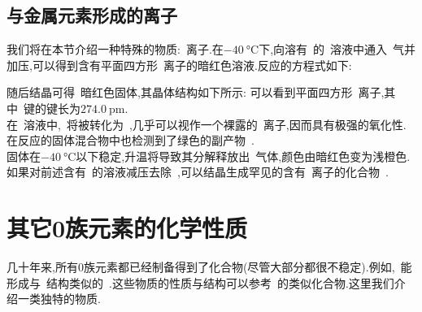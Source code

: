 \documentclass{ctexbook}
\begin{document}
\subsection{与金属元素形成的离子}
我们将在本节介绍一种特殊的物质:~离子\cite{Seidel2000}.在$\SI{-40}{\celsius}$下,向溶有~的~溶液中通入~气并加压,可以得到含有平面四方形~离子的暗红色溶液.反应的方程式如下:
\begin{tightcenter}
\end{tightcenter}
随后结晶可得~暗红色固体,其晶体结构如下所示:
可以看到平面四方形~离子,其中~键的键长为$\SI{274.0}{\pico\meter}$.\\
\indent 在~溶液中,~将被转化为~,几乎可以视作一个裸露的~离子,因而具有极强的氧化性.在反应的固体混合物中也检测到了绿色的副产物~\ce{[Xe2][Sb4F21]}.\\
\indent {}固体在$\SI{-40}{\celsius}$以下稳定,升温将导致其分解释放出~气体,颜色由暗红色变为浅橙色.如果对前述含有~的溶液减压去除~,可以结晶生成罕见的含有~离子的化合物~.
\section{其它0族元素的化学性质}
几十年来,所有0族元素都已经制备得到了化合物(尽管大部分都很不稳定).例如,~能形成与~结构类似的~.这些物质的性质与结构可以参考~的类似化合物.这里我们介绍一类独特的物质.
\end{document}
